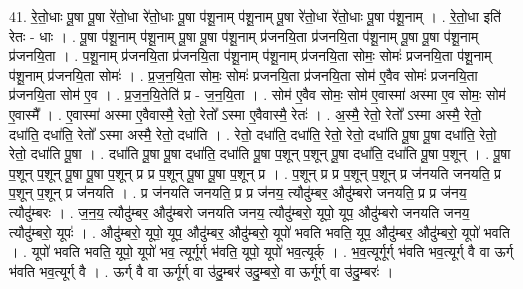 \documentclass[17pt]{extarticle}
\begin{document}
41. रे॒तो॒धाः पू॒षा पू॒षा रे॑तो॒धा रे॑तो॒धाः पू॒षा प॑शू॒नाम् प॑शू॒नाम् पू॒षा रे॑तो॒धा रे॑तो॒धाः पू॒षा प॑शू॒नाम् । . रे॒तो॒धा इति॑ रेतः - धाः । . पू॒षा प॑शू॒नाम् प॑शू॒नाम् पू॒षा पू॒षा प॑शू॒नाम् प्र॑जनयि॒ता प्र॑जनयि॒ता प॑शू॒नाम् पू॒षा पू॒षा प॑शू॒नाम् प्र॑जनयि॒ता । . प॒शू॒नाम् प्र॑जनयि॒ता प्र॑जनयि॒ता प॑शू॒नाम् प॑शू॒नाम् प्र॑जनयि॒ता सोमः॒ सोमः॑ प्रजनयि॒ता प॑शू॒नाम् प॑शू॒नाम् प्र॑जनयि॒ता सोमः॑ । . प्र॒ज॒न॒यि॒ता सोमः॒ सोमः॑ प्रजनयि॒ता प्र॑जनयि॒ता सोम॑ ए॒वैव सोमः॑ प्रजनयि॒ता प्र॑जनयि॒ता सोम॑ ए॒व । . प्र॒ज॒न॒यि॒तेति॑ प्र - ज॒न॒यि॒ता । . सोम॑ ए॒वैव सोमः॒ सोम॑ ए॒वास्मा॑ अस्मा ए॒व सोमः॒ सोम॑ ए॒वास्मै᳚ । . ए॒वास्मा॑ अस्मा ए॒वैवास्मै॒ रेतो॒ रेतो᳚ ऽस्मा ए॒वैवास्मै॒ रेतः॑ । . अ॒स्मै॒ रेतो॒ रेतो᳚ ऽस्मा अस्मै॒ रेतो॒ दधा॑ति॒ दधा॑ति॒ रेतो᳚ ऽस्मा अस्मै॒ रेतो॒ दधा॑ति । . रेतो॒ दधा॑ति॒ दधा॑ति॒ रेतो॒ रेतो॒ दधा॑ति पू॒षा पू॒षा दधा॑ति॒ रेतो॒ रेतो॒ दधा॑ति पू॒षा । . दधा॑ति पू॒षा पू॒षा दधा॑ति॒ दधा॑ति पू॒षा प॒शून् प॒शून् पू॒षा दधा॑ति॒ दधा॑ति पू॒षा प॒शून् । . पू॒षा प॒शून् प॒शून् पू॒षा पू॒षा प॒शून् प्र प्र प॒शून् पू॒षा पू॒षा प॒शून् प्र । . प॒शून् प्र प्र प॒शून् प॒शून् प्र ज॑नयति जनयति॒ प्र प॒शून् प॒शून् प्र ज॑नयति । . प्र ज॑नयति जनयति॒ प्र प्र ज॑नय॒ त्यौदु॑म्बर॒ औदु॑म्बरो जनयति॒ प्र प्र ज॑नय॒ त्यौदु॑म्बरः । . ज॒न॒य॒ त्यौदु॑म्बर॒ औदु॑म्बरो जनयति जनय॒ त्यौदु॑म्बरो॒ यूपो॒ यूप॒ औदु॑म्बरो जनयति जनय॒ त्यौदु॑म्बरो॒ यूपः॑ । . औदु॑म्बरो॒ यूपो॒ यूप॒ औदु॑म्बर॒ औदु॑म्बरो॒ यूपो॑ भवति भवति॒ यूप॒ औदु॑म्बर॒ औदु॑म्बरो॒ यूपो॑ भवति । . यूपो॑ भवति भवति॒ यूपो॒ यूपो॑ भव॒ त्यूर्गूर्ग् भ॑वति॒ यूपो॒ यूपो॑ भव॒त्यूर्क् । . भ॒व॒त्यूर्गूर्ग् भ॑वति भव॒त्यूर्ग् वै वा ऊर्ग् भ॑वति भव॒त्यूर्ग् वै । . ऊर्ग् वै वा ऊर्गूर्ग् वा उ॑दु॒म्बर॑ उदु॒म्बरो॒ वा ऊर्गूर्ग् वा उ॑दु॒म्बरः॑ । \newline
\end{document}
